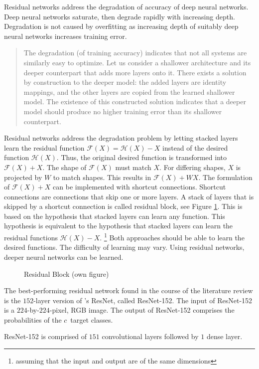 Residual networks address the degradation of accuracy of deep neural networks. Deep neural networks saturate, then degrade rapidly with increasing depth. Degradation is not caused by overfitting as increasing depth of suitably deep neural networks increases training error.\autocite{He.2016}
\blockquote[\cite{He.2016}]{
	The degradation (of training accuracy) indicates that not all systems are similarly easy to optimize. Let us consider a shallower architecture and its deeper counterpart that adds more layers onto it. There exists a solution by construction to the deeper model: the added layers are identity mappings, and the other layers are copied from the learned shallower model. The existence of this constructed solution indicates that a deeper model should produce no higher training error than its shallower counterpart.
}
Residual networks address the degradation problem by letting stacked layers learn the residual function $\mathcal{F}(X) = \mathcal{H}(X) - X$ instead of the desired function $\mathcal{H}(X)$. Thus, the original desired function is transformed into $\mathcal{F}(X) + X$. The shape of $\mathcal{F}(X)$ must match $X$. For differing shapes, $X$ is projected by $W$ to match shapes. This results in $\mathcal{F}(X) + WX$.
The formulation of $\mathcal{F}(X)+X$ can be implemented with shortcut connections. Shortcut connections are connections that skip one or more layers. A stack of layers that is skipped by a shortcut connection is called residual block, see Figure \ref{fig:resblock}.
This is based on the hypothesis that stacked layers can learn any function. This hypothesis is equivalent to the hypothesis that stacked layers can learn the residual functions $\mathcal{H}(X) - X$. \footnote{assuming that the input and output are of the same dimensions} Both approaches should be able to learn the desired functions. The difficulty of learning may vary.
Using residual networks, deeper neural networks can be learned. \autocite{He.2016}
\begin{figure}[H]
	\centering
	
	\caption{Residual Block (own figure)} \label{fig:resblock}
\end{figure}
\par
The best-performing residual network found in the course of the literature review is the $152$-layer version of \cite{He.2016}'s ResNet, called ResNet-152.
The input of ResNet-152 is a $224$-by-$224$-pixel, \ac{RGB} image. The output of ResNet-152 comprises the probabilities of the $c$~target classes. \autocite{He.2016}
\par
ResNet-152 is comprised of $151$ convolutional layers followed by $1$ dense layer.
